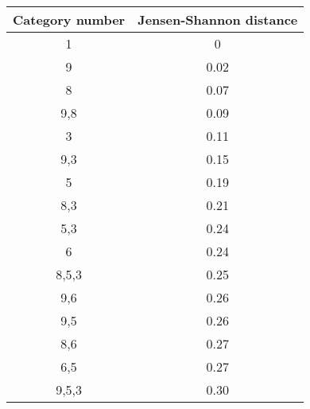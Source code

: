 \begin{tabular}{c|c}
    \hline
    Category number    & Jensen-Shannon distance  \\ \hline
    1                  & 0          \\ \hline
    9                & 0.02       \\ \hline
    8                & 0.07       \\ \hline
    9,8                & 0.09       \\ \hline
    3                  & 0.11       \\ \hline
    9,3                & 0.15       \\ \hline
    5                 & 0.19       \\ \hline
    8,3                & 0.21       \\ \hline
    5,3                 & 0.24       \\ \hline
    6                 & 0.24       \\ \hline
    8,5,3                & 0.25       \\ \hline
    9,6                & 0.26       \\ \hline
    9,5                & 0.26       \\ \hline
    8,6                & 0.27       \\ \hline
    6,5                 & 0.27       \\ \hline
    9,5,3                & 0.30       \\ \hline
\end{tabular}